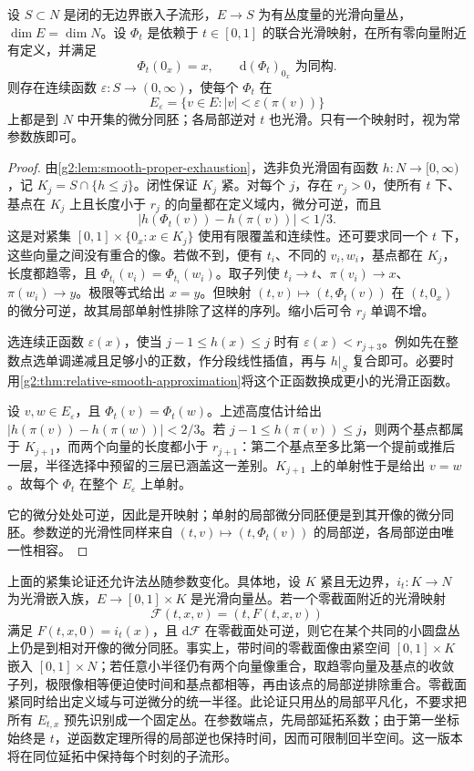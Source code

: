 \begin{lemma}\label{g2:lem:zero-section-shrinking}
	设 \(S\subset N\) 是闭的无边界嵌入子流形，\(E\to S\) 为有丛度量的光滑向量丛，\(\dim E=\dim N\)。设 \(\Phi_t\) 是依赖于 \(t\in[0,1]\) 的联合光滑映射，在所有零向量附近有定义，并满足
	\[
		\Phi_t(0_x)=x,\qquad \mathrm{d}(\Phi_t)_{0_x}\text{ 为同构}.
	\]
	则存在连续函数 \(\varepsilon:S\to(0,\infty)\)，使每个 \(\Phi_t\) 在
	\[
		E_\varepsilon=\{v\in E:|v|<\varepsilon(\pi(v))\}
	\]
	上都是到 \(N\) 中开集的微分同胚；各局部逆对 \(t\) 也光滑。只有一个映射时，视为常参数族即可。
\end{lemma}
\begin{proof}
	由\cref{g2:lem:smooth-proper-exhaustion}，选非负光滑固有函数 \(h:N\to[0,\infty)\)，记 \(K_j=S\cap\{h\le j\}\)。闭性保证 \(K_j\) 紧。对每个 \(j\)，存在 \(r_j>0\)，使所有 \(t\) 下、基点在 \(K_j\) 上且长度小于 \(r_j\) 的向量都在定义域内，微分可逆，而且
	\[
		|h(\Phi_t(v))-h(\pi(v))|<1/3.
	\]
	这是对紧集 \([0,1]\times\{0_x:x\in K_j\}\) 使用有限覆盖和连续性。还可要求同一个 \(t\) 下，这些向量之间没有重合的像。若做不到，便有 \(t_i\)、不同的 \(v_i,w_i\)，基点都在 \(K_j\)，长度都趋零，且 \(\Phi_{t_i}(v_i)=\Phi_{t_i}(w_i)\)。取子列使 \(t_i\to t\)、\(\pi(v_i)\to x\)、\(\pi(w_i)\to y\)。极限等式给出 \(x=y\)。但映射 \((t,v)\mapsto(t,\Phi_t(v))\) 在 \((t,0_x)\) 的微分可逆，故其局部单射性排除了这样的序列。缩小后可令 \(r_j\) 单调不增。

	选连续正函数 \(\varepsilon(x)\)，使当 \(j-1\le h(x)\le j\) 时有 \(\varepsilon(x)<r_{j+3}\)。例如先在整数点选单调递减且足够小的正数，作分段线性插值，再与 \(h|_S\) 复合即可。必要时用\cref{g2:thm:relative-smooth-approximation}将这个正函数换成更小的光滑正函数。

	设 \(v,w\in E_\varepsilon\)，且 \(\Phi_t(v)=\Phi_t(w)\)。上述高度估计给出 \(|h(\pi(v))-h(\pi(w))|<2/3\)。若 \(j-1\le h(\pi(v))\le j\)，则两个基点都属于 \(K_{j+1}\)，而两个向量的长度都小于 \(r_{j+1}\)：第二个基点至多比第一个提前或推后一层，半径选择中预留的三层已涵盖这一差别。\(K_{j+1}\) 上的单射性于是给出 \(v=w\)。故每个 \(\Phi_t\) 在整个 \(E_\varepsilon\) 上单射。

	它的微分处处可逆，因此是开映射；单射的局部微分同胚便是到其开像的微分同胚。参数逆的光滑性同样来自 \((t,v)\mapsto(t,\Phi_t(v))\) 的局部逆，各局部逆由唯一性相容。
\end{proof}

上面的紧集论证还允许法丛随参数变化。具体地，设 \(K\) 紧且无边界，\(i_t:K\to N\) 为光滑嵌入族，\(E\to[0,1]\times K\) 是光滑向量丛。若一个零截面附近的光滑映射
\[
	\mathcal F(t,x,v)=(t,F(t,x,v))
\]
满足 \(F(t,x,0)=i_t(x)\)，且 \(\mathrm{d}\mathcal F\) 在零截面处可逆，则它在某个共同的小圆盘丛上仍是到相对开像的微分同胚。事实上，带时间的零截面像由紧空间 \([0,1]\times K\) 嵌入 \([0,1]\times N\)；若任意小半径仍有两个向量像重合，取趋零向量及基点的收敛子列，极限像相等便迫使时间和基点都相等，再由该点的局部逆排除重合。零截面紧同时给出定义域与可逆微分的统一半径。此论证只用丛的局部平凡化，不要求把所有 \(E_{t,x}\) 预先识别成一个固定丛。在参数端点，先局部延拓系数；由于第一坐标始终是 \(t\)，逆函数定理所得的局部逆也保持时间，因而可限制回半空间。这一版本将在同位延拓中保持每个时刻的子流形。

